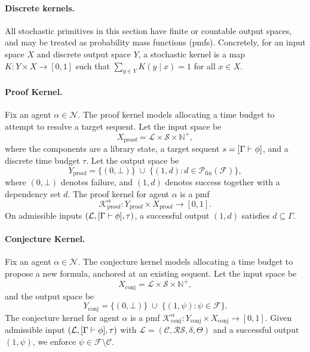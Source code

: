 \paragraph{Discrete kernels.}
All stochastic primitives in this section have finite or countable output spaces, and may be treated as
probability mass functions (pmfs). Concretely, for an input space $X$ and discrete output space $Y$,
a stochastic kernel is a map $K:Y\times X\to[0,1]$ such that $\sum_{y\in Y}K(y\mid x)=1$ for all $x\in X$.
 
\paragraph{Proof Kernel.}
 
Fix an agent $\alpha\in\mathcal{N}$. The proof kernel models allocating a time budget to attempt to resolve a target sequent. Let the input space be
\[
X_{\mathrm{proof}} = \mathscr{L}\times\mathcal{S}\times \mathbb{N}^+,
\]
where the components are a library state, a target sequent $s=[\Gamma\vdash\phi]$, and a discrete time budget $\tau$. Let the output space be
\[
Y_{\mathrm{proof}} = \{(0,\bot)\}\;\cup\;\{(1,d): d\in\mathcal{P}_{\mathrm{fin}}(\mathcal{F})\},
\]
where $(0,\bot)$ denotes failure, and $(1,d)$ denotes success together with a dependency set $d$. The proof kernel for agent $\alpha$ is a pmf
\[\mathcal{K}^{\alpha}_{\mathrm{proof}} : Y_{\mathrm{proof}}\times X_{\mathrm{proof}} \to [0,1].\]
On admissible inputs $(\mathcal{L},[\Gamma\vdash\phi],\tau)$, a successful output $(1,d)$ satisfies $d\subseteq\Gamma$.
 
\paragraph{Conjecture Kernel.}
 
Fix an agent $\alpha\in\mathcal{N}$. The conjecture kernel models allocating a time budget to propose a new formula, anchored at an existing sequent. Let the input space be
\[
X_{\mathrm{conj}} =\mathscr{L}\times \mathcal{S}\times \mathbb{N}^+,
\]
and the output space be
\[
Y_{\mathrm{conj}} = \{(0,\bot)\}\;\cup\;\{(1,\psi): \psi\in\mathcal{F}\}.
\]
The conjecture kernel for agent $\alpha$ is a pmf
$\mathcal{K}^{\alpha}_{\mathrm{conj}} : Y_{\mathrm{conj}}\times X_{\mathrm{conj}} \to [0,1]$.
Given admissible input $(\mathcal{L}, [\Gamma \vdash \phi], \tau)$ with $\mathcal{L} = (\mathcal{C},\mathcal{RS},\delta,\Theta)$ and a successful output $(1,\psi)$, we enforce $\psi \in \mathcal{F} \setminus \mathcal{C}$.
 
